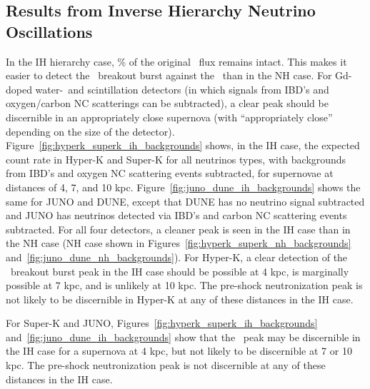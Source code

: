 \subsection{Results from Inverse Hierarchy Neutrino Oscillations}
In the IH hierarchy case, \% of the original \nue\ flux remains
intact.  This makes it easier to detect the \nue\ breakout burst
against the \backgrounds\ than in the NH case.  For
Gd-doped water-\cer\ and scintillation detectors (in which signals from
IBD's and oxygen/carbon NC scatterings can be subtracted), a clear peak
should be discernible in an appropriately close supernova (with
``appropriately close'' depending on the size of the detector).  
Figure~\ref{fig:hyperk_superk_ih_backgrounds}
shows, in the IH case, the expected count rate in Hyper-K and Super-K 
for all neutrinos types, with
backgrounds from IBD's and oxygen NC scattering events subtracted, for
supernovae at distances of 4, 7, and 10 kpc.  
Figure~\ref{fig:juno_dune_ih_backgrounds} shows the same for JUNO and
DUNE, except that DUNE has no neutrino signal subtracted and JUNO has
neutrinos detected via IBD's and carbon NC scattering events subtracted.
For all four detectors, a
cleaner peak is seen in the IH case than in the NH case (NH case shown
in Figures~\ref{fig:hyperk_superk_nh_backgrounds} and~\ref{fig:juno_dune_nh_backgrounds}).  For Hyper-K, 
a clear detection of
the \nue\ breakout burst peak in the IH case 
should be possible at 4 kpc, is
marginally possible at 7 kpc, and is unlikely at 10 kpc. The
pre-shock neutronization peak is not likely to be discernible in
Hyper-K at
any of these distances in the IH case.

For Super-K and JUNO,
Figures~\ref{fig:hyperk_superk_ih_backgrounds} and~\ref{fig:juno_dune_ih_backgrounds} show that
the \nue\ peak may be discernible in the IH case for a supernova at 4
kpc, but not likely to be discernible at 7 or 10 kpc.  The pre-shock
neutronization peak is not discernible at any of these
distances in the IH case.


